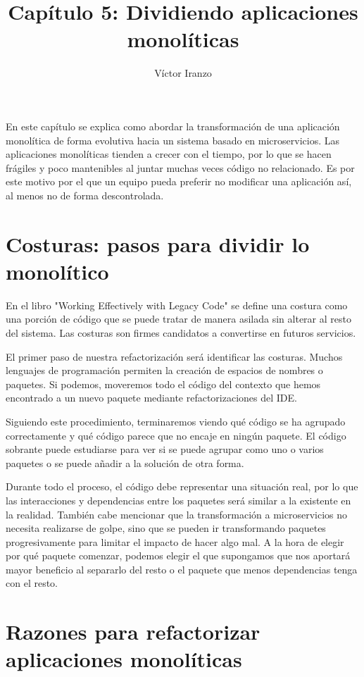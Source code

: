 \documentclass[11pt,a4paper]{article}
\author{Víctor Iranzo}
\title{Capítulo 5: Dividiendo aplicaciones monolíticas}
\begin{document}
\maketitle

En este capítulo se explica como abordar la transformación de una aplicación monolítica de forma evolutiva hacia un sistema basado en microservicios. Las aplicaciones monolíticas tienden a crecer con el tiempo, por lo que se hacen frágiles y poco mantenibles al juntar muchas veces código no relacionado. Es por este motivo por el que un equipo pueda preferir no modificar una aplicación así, al menos no de forma descontrolada.

\section{Costuras: pasos para dividir lo monolítico}

En el libro "Working Effectively with Legacy Code" se define una costura como una porción de código que se puede tratar de manera asilada sin alterar al resto del sistema. Las costuras son firmes candidatos a convertirse en futuros servicios.

El primer paso de nuestra refactorización será identificar las costuras. Muchos lenguajes de programación permiten la creación de espacios de nombres o paquetes. Si podemos, moveremos todo el código del contexto que hemos encontrado a un nuevo paquete mediante refactorizaciones del IDE. 

Siguiendo este procedimiento, terminaremos viendo qué código se ha agrupado correctamente y qué código parece que no encaje en ningún paquete. El código sobrante puede estudiarse para ver si se puede agrupar como uno o varios paquetes o se puede añadir a la solución de otra forma. 

Durante todo el proceso, el código debe representar una situación real, por lo que las interacciones y dependencias entre los paquetes será similar a la existente en la realidad. También cabe mencionar que la transformación a microservicios no necesita realizarse de golpe, sino que se pueden ir transformando paquetes progresivamente para limitar el impacto de hacer algo mal. A la hora de elegir por qué paquete comenzar, podemos elegir el que supongamos que nos aportará mayor beneficio al separarlo del resto o el paquete que menos dependencias tenga con el resto.

\section{Razones para refactorizar aplicaciones monolíticas}
\end{document}

